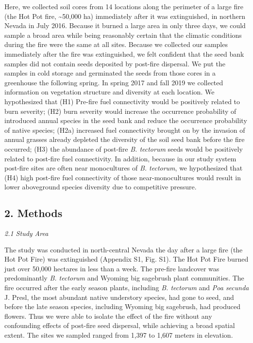\documentclass[
  12pt,
]{article}
\begin{document}
Here, we collected soil cores from 14 locations along the perimeter of a
large fire (the Hot Pot fire, \textasciitilde50,000 ha) immediately
after it was extinguished, in northern Nevada in July 2016. Because it
burned a large area in only three days, we could sample a broad area
while being reasonably certain that the climatic conditions during the
fire were the same at all sites. Because we collected our samples
immediately after the fire was extinguished, we felt confident that the
seed bank samples did not contain seeds deposited by post-fire
dispersal. We put the samples in cold storage and germinated the seeds
from those cores in a greenhouse the following spring. In spring 2017
and fall 2019 we collected information on vegetation structure and
diversity at each location. We hypothesized that (H1) Pre-fire fuel
connectivity would be positively related to burn severity; (H2) burn
severity would increase the occurrence probability of introduced annual
species in the seed bank and reduce the occurrence probability of native
species; (H2a) increased fuel connectivity brought on by the invasion of
annual grasses already depleted the diversity of the soil seed bank
before the fire occurred; (H3) the abundance of post-fire \emph{B.
tectorum} seeds would be positively related to post-fire fuel
connectivity. In addition, because in our study system post-fire sites
are often near monocultures of \emph{B. tectorum}, we hypothesized that
(H4) high post-fire fuel connectivity of those near-monocultures would
result in lower aboveground species diversity due to competitive
pressure.

\hypertarget{methods}{%
\subsection{2. Methods}\label{methods}}

\emph{2.1 Study Area}

The study was conducted in north-central Nevada the day after a large
fire (the Hot Pot Fire) was extinguished (Appendix S1, Fig. S1). The Hot
Pot Fire burned just over 50,000 hectares in less than a week. The
pre-fire landcover was predominantly \emph{B. tectorum} and Wyoming big
sagebrush plant communities. The fire occurred after the early season
plants, including \emph{B. tectorum} and \emph{Poa secunda} J. Presl,
the most abundant native understory species, had gone to seed, and
before the late season species, including Wyoming big sagebrush, had
produced flowers. Thus we were able to isolate the effect of the fire
without any confounding effects of post-fire seed dispersal, while
achieving a broad spatial extent. The sites we sampled ranged from 1,397
to 1,607 meters in elevation.
\end{document}
